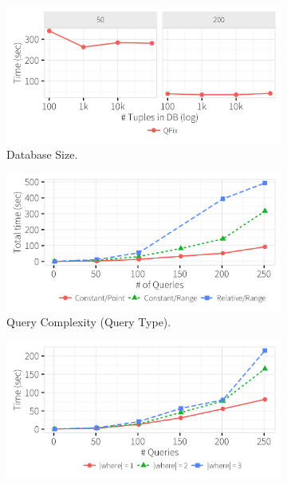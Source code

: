 \iffalse  
  \begin{figure}[h]
    \centering
    \begin{subfigure}[t]{.3\textwidth}
      \includegraphics[width = .99\columnwidth]{figures/dbsize_time}
      \vspace*{-.1in}
      \caption{Database Size.}
      \label{f:dbsize_time} 
    \end{subfigure}
        \begin{subfigure}[t]{.3\textwidth}
      \includegraphics[width = .99\columnwidth]{figures/pointrelv_time}
      \vspace*{-.1in}
      \caption{Query Complexity (Query Type).}
      \label{f:qidx_time} 
    \end{subfigure}
    \begin{subfigure}[t]{.3\textwidth}
      \includegraphics[width = .99\columnwidth]{figures/where_time}

\end{subfigure}
\end{figure}
